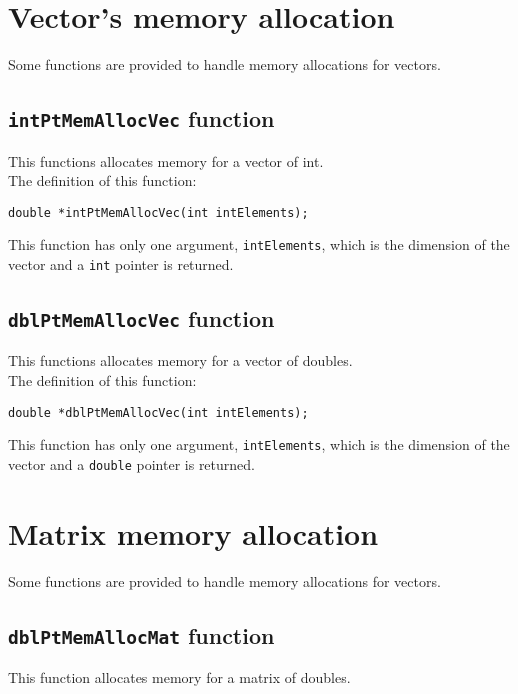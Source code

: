 \section{Vector's memory allocation}

Some functions are provided to handle memory allocations for vectors.

\subsection{\texttt{intPtMemAllocVec} function} \label{sec:intPtMemAllocVec}

This functions allocates memory for a vector of int.\\

The definition of this function:
%
\begin{verbatim}
double *intPtMemAllocVec(int intElements);  
\end{verbatim}
%
This function has only one argument, \texttt{intElements}, which is the dimension of the vector and a \texttt{int} pointer is returned.

\subsection{\texttt{dblPtMemAllocVec} function} \label{sec:dblPtMemAllocVec}

This functions allocates memory for a vector of doubles.\\

The definition of this function:
%
\begin{verbatim}
double *dblPtMemAllocVec(int intElements);  
\end{verbatim}
%
This function has only one argument, \texttt{intElements}, which is the dimension of the vector and a \texttt{double} pointer is returned.

\section{Matrix memory allocation}

Some functions are provided to handle memory allocations for vectors.

\subsection{\texttt{dblPtMemAllocMat} function} \label{sec:dblPtMemAllocMat}

This function allocates memory for a matrix of doubles.\\

